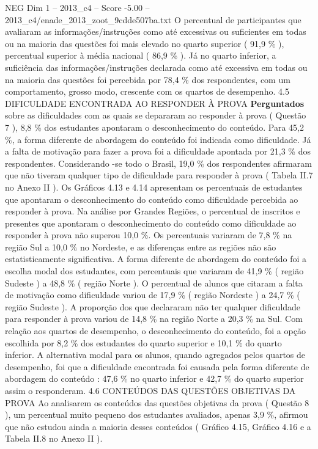 \begin{textsample}{NEG Dim 1 – 2013\_c4 – Score -5.00 – 2013\_c4/enade\_2013\_zoot\_9cdde507ba.txt}
O percentual de participantes que avaliaram as informações/instruções como até excessivas ou suficientes em todas ou na maioria das questões foi mais elevado no quarto superior ( 91,9 \% ), percentual superior à média nacional ( 86,9 \% ).
Já no quarto inferior, a suficiência das informações/instruções declarada como até excessiva em todas ou na maioria das questões foi percebida por 78,4 \% dos respondentes, com um comportamento, grosso modo, crescente com os quartos de desempenho. 4.5 DIFICULDADE ENCONTRADA AO RESPONDER À PROVA \textbf{Perguntados} sobre as dificuldades com as quais se depararam ao responder à prova ( Questão 7 ), 8,8 \% dos estudantes apontaram o desconhecimento do conteúdo.
Para 45,2 \%, a forma diferente de abordagem do conteúdo foi indicada como dificuldade.
Já a falta de motivação para fazer a prova foi a dificuldade apontada por 21,3 \% dos respondentes.
Considerando -se todo o Brasil, 19,0 \% dos respondentes afirmaram que não tiveram qualquer tipo de dificuldade para responder à prova ( Tabela II.7 no Anexo II ).
Os Gráficos 4.13 e 4.14 apresentam os percentuais de estudantes que apontaram o desconhecimento do conteúdo como dificuldade percebida ao responder à prova.
Na análise por Grandes Regiões, o percentual de inscritos e presentes que apontaram o desconhecimento do conteúdo como dificuldade ao responder à prova não superou 10,0 \%.
Os percentuais variaram de 7,8 \% na região Sul a 10,0 \% no Nordeste, e as diferenças entre as regiões não são estatisticamente significativa.
A forma diferente de abordagem do conteúdo foi a escolha modal dos estudantes, com percentuais que variaram de 41,9 \% ( região Sudeste ) a 48,8 \% ( região Norte ).
O percentual de alunos que citaram a falta de motivação como dificuldade variou de 17,9 \% ( região Nordeste ) a 24,7 \% ( região Sudeste ).
A proporção dos que declararam não ter qualquer dificuldade para responder à prova variou de 14,8 \% na região Norte a 20,3 \% na Sul.
Com relação aos quartos de desempenho, o desconhecimento do conteúdo, foi a opção escolhida por 8,2 \% dos estudantes do quarto superior e 10,1 \% do quarto inferior.
A alternativa modal para os alunos, quando agregados pelos quartos de desempenho, foi que a dificuldade encontrada foi causada pela forma diferente de abordagem do conteúdo : 47,6 \% no quarto inferior e 42,7 \% do quarto superior assim o responderam. 4.6 CONTEÚDOS DAS QUESTÕES OBJETIVAS DA PROVA Ao analisarem os conteúdos das questões objetivas da prova ( Questão 8 ), um percentual muito pequeno dos estudantes avaliados, apenas 3,9 \%, afirmou que não estudou ainda a maioria desses conteúdos ( Gráfico 4.15, Gráfico 4.16 e a Tabela II.8 no Anexo II ).

\end{textsample}
